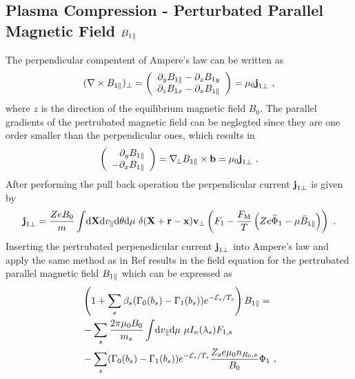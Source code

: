 \subsection{Plasma Compression - Perturbated Parallel Magnetic Field $B_{1\parallel}$}
\label{sub:fieldMagnetic}

The perpendicular compentent of Ampere's law can be written as 
\begin{gather}
	(\nabla \times B_{1\parallel})_\perp = \left( \begin{array}{c} \partial_y B_{1\parallel} - \partial_z B_{1 y} \\ \partial_z B_{1x} - \partial_x B_{1\parallel} \end{array} \right) = \mu_0 \boldsymbol{\mathbf{j}}_{1 \perp}~,
	\label{eq:perpendicularAmpereLawLocal}
\end{gather}
where $z$ is the direction of the equilibrium magnetic field $B_0$. The parallel gradients of the pertrubated magnetic field can be neglegted since they are one order smaller than the perpendicular ones, which results in
\begin{gather}
	\left( \begin{array}{r} \partial_y B_{1\parallel} \\ - \partial_x B_{1\parallel} \end{array} \right) = \nabla_{\!\perp} B_{1\parallel} \times \boldsymbol{\mathbf{b}} = \mu_0 \boldsymbol{\mathbf{j}}_{1 \perp}~.
\end{gather}
After performing the pull back operation the perpendicular current $\boldsymbol{\mathbf{j}}_{1\perp}$ is given by 
\begin{gather}
		\boldsymbol{\mathbf{j}}_{1\perp} = \frac{Ze B_0}{m} \int \! \mathrm{d}\boldsymbol{\mathbf{X}}\mathrm{d}v_\parallel\mathrm{d}\theta\mathrm{d}\mu ~ \delta(\boldsymbol{\mathbf{X}} + \boldsymbol{\mathbf{r}} - \boldsymbol{\mathbf{x}}) \boldsymbol{\mathbf{v}}_\perp \left(F_1 - \frac{F_\mathrm{M}}{T}\left(Ze \widetilde{\Phi}_1 - \mu \bar{B}_{1\parallel}\right) \right) ~.
	\label{eq:perpendicularCurrentPullbackLocal}
\end{gather}
Inserting the pertrubated perpenedicular current $\boldsymbol{\mathbf{j}}_{1 \perp}$ into Ampere's law and apply the same method as in Ref  results in the field equation for the pertrubated parallel magnetic field $B_{1\parallel}$ which can be expressed as
\begin{gather}
    \begin{aligned}
        &\left(1 + \sum_s \beta_s (\Gamma_0(b_s) - \Gamma_1(b_s)) e^{-\mathcal{E}_s/T_s}\right) B_{1\parallel} = \\
	 &- \sum_s \frac{2\pi \mu_0 B_0}{m_s} \int \! \mathrm{d}v_\parallel\mathrm{d}\mu ~ \mu I_n(\lambda_s) F_{1,s}  \\
        &- \sum_s (\Gamma_0(b_s) - \Gamma_1(b_s))e^{-\mathcal{E}_s/T_s} \frac{Z_se \mu_0 n_{R_0,s}}{B_0} \Phi_1 ~,
    \end{aligned}
    \label{eq:fieldMagneticLocal}
\end{gather}
